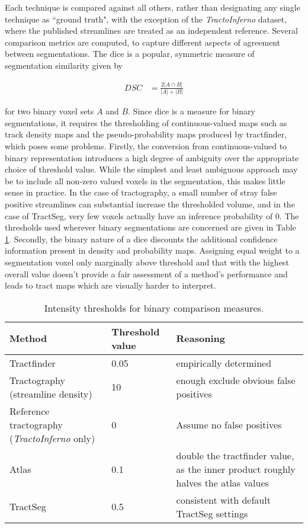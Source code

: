 Each technique is compared against all others, rather than designating any single technique as ``ground truth", with the exception of the \textit{TractoInferno} dataset, where the published streamlines are treated as an independent reference.
Several comparison metrics are computed, to capture different aspects of agreement between segmentations.
The \gls{dice} \autocite{Dice1945} is a popular, symmetric measure of segmentation similarity given by

\begin{align}
  DSC &= \frac{2 |A \cap B|}{|A| + |B|}
\end{align}

for two binary voxel sets $A$ and $B$.
Since \gls{dice} is a measure for binary segmentations, it requires the thresholding of continuous-valued maps such as track density maps and the pseudo-probability maps produced by tractfinder, which poses some problems.
Firstly, the conversion from continuous-valued to binary representation introduces a high degree of ambiguity over the appropriate choice of threshold value.
While the simplest and least ambiguous approach may be to include all non-zero valued voxels in the segmentation, this makes little sense in practice.
In the case of tractography, a small number of stray false positive streamlines can substantial increase the thresholded volume, and in the case of TractSeg, very few voxels actually have an inference probability of 0.
The thresholds used wherever binary segmentations are concerned are given in Table \ref{tab:thresh}.
Secondly, the binary nature of a \gls{dice} discounts the additional confidence information present in density and probability maps.
Assigning equal weight to a segmentation voxel only marginally above threshold and that with the highest overall value doesn't provide a fair assessment of a method's performance and leads to tract maps which are visually harder to interpret.

\begin{table}[h!]
  \caption{Intensity thresholds for binary comparison measures.}
  \label{tab:thresh}
  \small
  \begin{tabularx}{\textwidth}{>{\raggedright\arraybackslash}X l >{\raggedright\arraybackslash}X}
    \toprule
    Method    & Threshold value & Reasoning \\
    \midrule
    Tractfinder   & 0.05 & empirically determined \\
    Tractography (streamline density) & 10 & enough exclude obvious false positives \\
    Reference tractography (\textit{TractoInferno} only) & 0 & Assume no false positives \\
    Atlas         & 0.1 & double the tractfinder value, as the inner product roughly halves the atlas values \\
    TractSeg      & 0.5 & consistent with default TractSeg settings \\ \bottomrule
  \end{tabularx}
\end{table}

